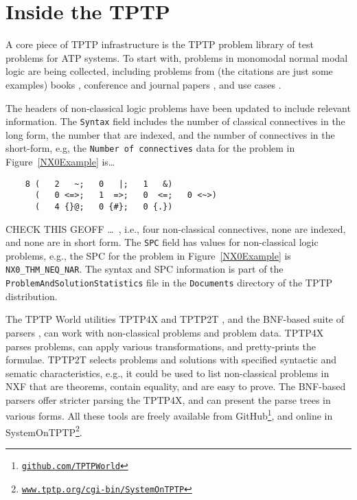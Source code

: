 \documentclass[runningheads]{llncs}
\begin{document}
\section{Inside the TPTP}
\label{InsideTPTP}

A core piece of TPTP infrastructure is the TPTP problem library of test problems for
ATP systems.
To start with, problems in monomodal normal modal logic are being collected, including problems 
from (the citations are just some examples)
books \cite{For94,FM98,Gir00,Sid10}, 
conference and journal papers \cite{Rei92,FH+98,Sto00,PN+21}, 
and 
use cases \cite{BW14-ECAI,MR22}.

The headers of non-classical logic problems have been updated to include relevant information.
The {\tt Syntax} field includes the number of classical connectives in the long form, the 
number that are indexed, and the number of connectives in the short-form, e.g,
the {\tt Number of connectives} data for the problem in Figure~\ref{NX0Example} is\ldots
\begin{verbatim}
    8 (   2   ~;   0   |;   1   &)
      (   0 <=>;   1  =>;   0  <=;   0 <~>)
      (   4 {}@;   0 {#};   0 {.})
\end{verbatim}
CHECK THIS GEOFF
\ldots~, i.e., four non-classical connectives, none are indexed, and none are in short form.
The {\tt SPC} field has values for non-classical logic problems, e.g., the SPC for the problem 
in Figure~\ref{NX0Example} is {\tt NX0\_THM\_NEQ\_NAR}.
The syntax and SPC information is part of the {\tt ProblemAndSolutionStatistics} file in the 
{\tt Documents} directory of the TPTP distribution.

The TPTP World utilities TPTP4X and TPTP2T \cite{Sut07-CSR,Sut10}, and the BNF-based suite
of parsers \cite{VS06}, can work with non-classical problems and problem data.
TPTP4X parses problems, can apply various transformations, and pretty-prints the formulae.
TPTP2T selects problems and solutions with specified syntactic and sematic characteristics,
e.g., it could be used to list non-classical problems in NXF that are theorems, contain equality,
and are easy to prove.
The BNF-based parsers offer stricter parsing the TPTP4X, and can present the parse trees in
various forms.
All these tools are freely available from GitHub\footnote{%
\href{https://github.com/TPTPWorld}{\tt github.com/TPTPWorld}}, and online in 
SystemOnTPTP\footnote{%
\href{https://www.tptp.org/cgi-bin/SystemOnTPTP}{\tt www.tptp.org/cgi-bin/SystemOnTPTP}}.
\end{document}
